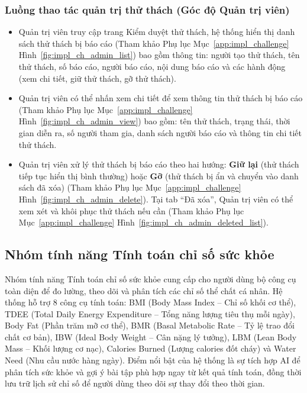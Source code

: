 \subsubsection{Luồng thao tác quản trị thử thách (Góc độ Quản trị viên)}
\begin{itemize}
    \item Quản trị viên truy cập trang Kiểm duyệt thử thách, hệ thống hiển thị danh sách thử thách bị báo cáo (Tham khảo Phụ lục Mục~\ref{app:impl_challenge} Hình~\ref{fig:impl_ch_admin_list}) bao gồm thông tin: người tạo thử thách, tên thử thách, số báo cáo, người báo cáo, nội dung báo cáo và các hành động (xem chi tiết, giữ thử thách, gỡ thử thách).


    \item Quản trị viên có thể nhấn xem chi tiết để xem thông tin thử thách bị báo cáo (Tham khảo Phụ lục Mục~\ref{app:impl_challenge} Hình~\ref{fig:impl_ch_admin_view}) bao gồm: tên thử thách, trạng thái, thời gian diễn ra, số người tham gia, danh sách người báo cáo và thông tin chi tiết thử thách.


    \item Quản trị viên xử lý thử thách bị báo cáo theo hai hướng: \textbf{Giữ lại} (thử thách tiếp tục hiển thị bình thường) hoặc \textbf{Gỡ} (thử thách bị ẩn và chuyển vào danh sách đã xóa) (Tham khảo Phụ lục Mục~\ref{app:impl_challenge} Hình~\ref{fig:impl_ch_admin_delete}). Tại tab ``Đã xóa'', Quản trị viên có thể xem xét và khôi phục thử thách nếu cần (Tham khảo Phụ lục Mục~\ref{app:impl_challenge} Hình~\ref{fig:impl_ch_admin_deleted_list}).

\end{itemize}

\subsection{Nhóm tính năng Tính toán chỉ số sức khỏe}
\label{subsec:impl_health_calculator}

Nhóm tính năng Tính toán chỉ số sức khỏe cung cấp cho người dùng bộ công cụ toàn diện để đo lường, theo dõi và phân tích các chỉ số thể chất cá nhân. Hệ thống hỗ trợ 8 công cụ tính toán: BMI (Body Mass Index -- Chỉ số khối cơ thể), TDEE (Total Daily Energy Expenditure -- Tổng năng lượng tiêu thụ mỗi ngày), Body Fat (Phần trăm mỡ cơ thể), BMR (Basal Metabolic Rate -- Tỷ lệ trao đổi chất cơ bản), IBW (Ideal Body Weight -- Cân nặng lý tưởng), LBM (Lean Body Mass -- Khối lượng cơ nạc), Calories Burned (Lượng calories đốt cháy) và Water Need (Nhu cầu nước hàng ngày). Điểm nổi bật của hệ thống là sự tích hợp AI để phân tích sức khỏe và gợi ý bài tập phù hợp ngay từ kết quả tính toán, đồng thời lưu trữ lịch sử chỉ số để người dùng theo dõi sự thay đổi theo thời gian.

